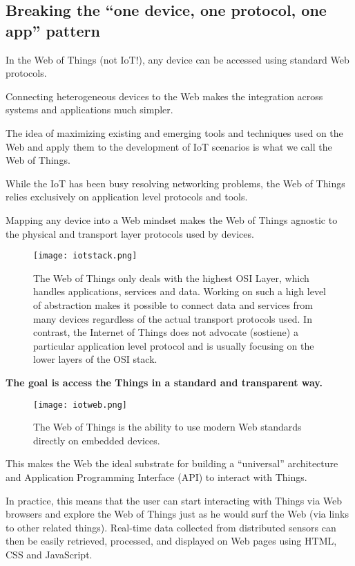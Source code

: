 \subsection{Breaking the ``one device, one protocol, one app'' pattern}

In the Web of Things (not IoT!), any device can be accessed using standard Web
protocols.

Connecting heterogeneous devices to the Web makes the integration across
systems and applications much simpler.

The idea of maximizing existing and emerging tools and techniques used on the
Web and apply them to the development of IoT scenarios is what we call the Web
of Things.

While the IoT has been busy resolving networking problems, the Web of Things
relies exclusively on application level protocols and tools.

Mapping any device into a Web mindset makes the Web of Things agnostic to the
physical and transport layer protocols used by devices.

\begin{figure}[H]
  \centering
  \texttt{[image: iotstack.png]}
  \caption{The Web of Things only deals with the highest OSI Layer, which
handles applications, services and data.
Working on such a high level of abstraction makes it possible to connect data
and services from many devices regardless of the actual transport protocols
used.
In contrast, the Internet of Things does not advocate (sostiene) a particular
application level protocol and is usually focusing on the lower layers of the
OSI stack.}
  \label{fig:iotstack}
\end{figure}

\textbf{The goal is access the Things in a standard and transparent
way.}

\begin{figure}[H]
  \centering
  \texttt{[image: iotweb.png]}
  \caption{The Web of Things is the ability to use modern Web standards
directly on embedded devices.}
  \label{fig:iotweb}
\end{figure}

This makes the Web the ideal substrate for building a ``universal''
architecture and Application Programming Interface (API) to interact with
Things.

In practice, this means that the user can start interacting with Things via Web
browsers and explore the Web of Things just as he would surf the Web (via links
to other related things).
Real-time data collected from distributed sensors can then be easily retrieved,
processed, and displayed on Web pages using HTML, CSS and JavaScript.

